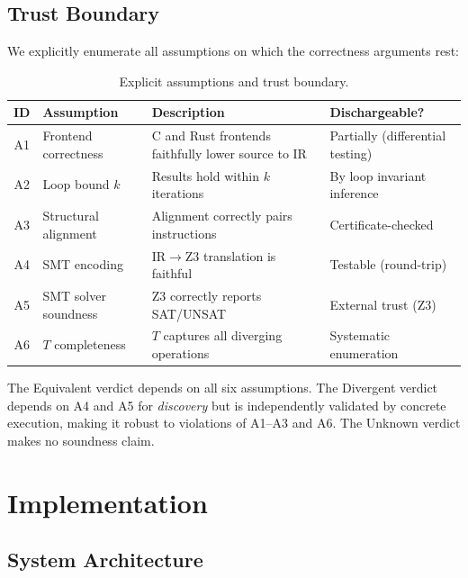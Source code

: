 \documentclass[11pt]{article}
\begin{document}
\subsection{Trust Boundary}
\label{sec:trust}

We explicitly enumerate all assumptions on which the correctness arguments rest:

\begin{table}[H]
\centering
\caption{Explicit assumptions and trust boundary.}
\label{tab:assumptions}
\begin{tabular}{@{}clp{6cm}l@{}}
\toprule
ID & Assumption & Description & Dischargeable? \\
\midrule
A1 & Frontend correctness & C and Rust frontends faithfully lower source to IR & Partially (differential testing) \\
A2 & Loop bound $k$ & Results hold within $k$ iterations & By loop invariant inference \\
A3 & Structural alignment & Alignment correctly pairs instructions & Certificate-checked \\
A4 & SMT encoding & IR$\to$Z3 translation is faithful & Testable (round-trip) \\
A5 & SMT solver soundness & Z3 correctly reports SAT/UNSAT & External trust (Z3) \\
A6 & $T$ completeness & $T$ captures all diverging operations & Systematic enumeration \\
\bottomrule
\end{tabular}
\end{table}

The Equivalent verdict depends on all six assumptions. The Divergent verdict depends on A4 and A5 for \emph{discovery} but is independently validated by concrete execution, making it robust to violations of A1--A3 and A6. The Unknown verdict makes no soundness claim.


\section{Implementation}
\label{sec:impl}

\subsection{System Architecture}
\label{sec:impl-arch}
\end{document}

